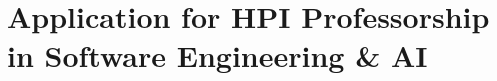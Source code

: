 \section{Application for HPI Professorship in Software Engineering \& AI}

\lipsum[1]\par
\lipsum[2]\par
\softtext{\lipsum[3]}
